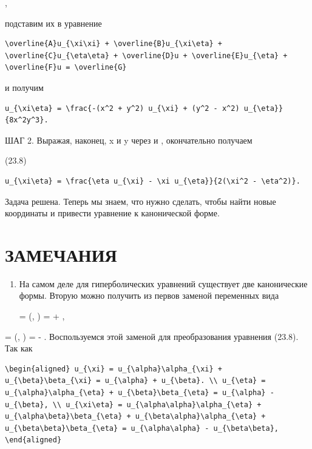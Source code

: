 \documentclass[
  ukrainian,
]{article}
\begin{document}
,

подставим их в уравнение

\begin{verbatim}
\overline{A}u_{\xi\xi} + \overline{B}u_{\xi\eta} + \overline{C}u_{\eta\eta} + \overline{D}u + \overline{E}u_{\eta} + \overline{F}u = \overline{G}
\end{verbatim}

и получим

\begin{verbatim}
u_{\xi\eta} = \frac{-(x^2 + y^2) u_{\xi} + (y^2 - x^2) u_{\eta}}{8x^2y^3}.
\end{verbatim}

ШАГ 2. Выражая, наконец, x и y через \xi   и \eta  , окончательно
получаем

(23.8)

\begin{verbatim}
u_{\xi\eta} = \frac{\eta u_{\xi} - \xi u_{\eta}}{2(\xi^2 - \eta^2)}.
\end{verbatim}

Задача решена. Теперь мы знаем, что нужно сделать, чтобы найти новые
координаты и привести уравнение к канонической форме.

\section{ЗАМЕЧАНИЯ}\label{ux437ux430ux43cux435ux447ux430ux43dux438ux44f-3}

\begin{enumerate}
\def\labelenumi{\arabic{enumi}.}
\item
  На самом деле для гиперболических уравнений существует две
  канонические формы. Вторую можно получить из первов заменой переменных
  вида

  \alpha = \alpha (\xi, \eta) = \xi + \eta,
\end{enumerate}

\beta = \beta (\xi, \eta) = \xi - \eta. Воспользуемся этой заменой для
преобразования уравнения (23.8). Так как

\begin{verbatim}
\begin{aligned} u_{\xi} = u_{\alpha}\alpha_{\xi} + u_{\beta}\beta_{\xi} = u_{\alpha} + u_{\beta}. \\ u_{\eta} = u_{\alpha}\alpha_{\eta} + u_{\beta}\beta_{\eta} = u_{\alpha} - u_{\beta}, \\ u_{\xi\eta} = u_{\alpha\alpha}\alpha_{\eta} + u_{\alpha\beta}\beta_{\eta} + u_{\beta\alpha}\alpha_{\eta} + u_{\beta\beta}\beta_{\eta} = u_{\alpha\alpha} - u_{\beta\beta}, \end{aligned}
\end{verbatim}
\end{document}
